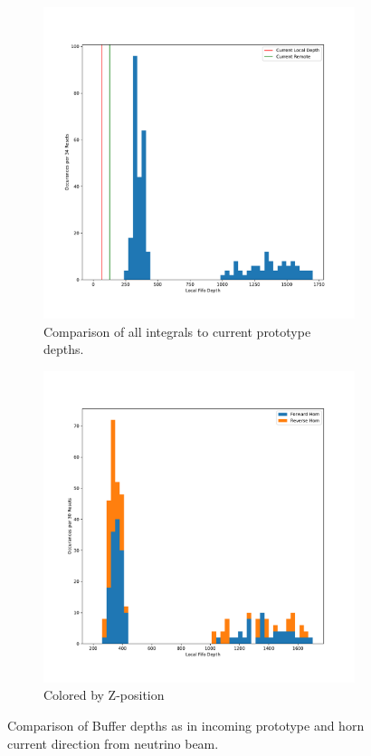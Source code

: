 \begin{figure}
\centering
\begin{subfigure}{.5\textwidth}
  \centering
  \includegraphics[width=\textwidth]{images/df_nolabel_line.pdf}
  \caption{Comparison of all integrals to current prototype depths.}
\end{subfigure}%
\begin{subfigure}{.5\textwidth}
  \centering
  \includegraphics[width=\textwidth]{images/df_horn_cut.pdf}
  \caption{Colored by Z-position}
\end{subfigure}
\caption{Comparison of Buffer depths as in incoming prototype and horn current direction from neutrino beam.}
\label{fig:compare_integral_nolabel}
\end{figure}